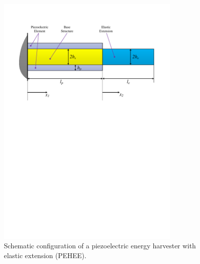 \documentclass{elsarticle}
\begin{document}
\begin{figure}[!htbp]
    \centering
    \includegraphics[width=0.8\textwidth]{./fig_beam_configuration.pdf}
    \caption{Schematic configuration of a piezoelectric energy harvester with elastic extension (PEHEE). }
    \label{fig:fig_beam_configuration}
\end{figure}
\end{document}
